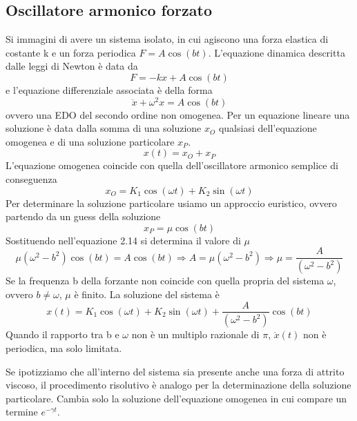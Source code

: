 \subsection{Oscillatore armonico forzato}
Si immagini di avere un sistema isolato, in cui agiscono una forza elastica di costante k e un forza periodica $F = A \cos(bt)$. L'equazione dinamica descritta dalle leggi di Newton \`{e} data da 
\begin{equation}
	F = -kx + A \cos(bt)
\end{equation}
e l'equazione differenziale associata \`{e} della forma 
\begin{equation}
	\ddot{x} + \omega^2x = A \cos (bt)
\end{equation}
ovvero una EDO del secondo ordine non omogenea. Per un equazione lineare una soluzione \`{e} data dalla somma di una soluzione $x_O$ qualsiasi dell'equazione omogenea e di una soluzione particolare $x_P$.
\begin{equation*}
	x(t) = x_O + x_P
\end{equation*}
L'equazione omogenea coincide con quella dell'oscillatore armonico semplice di conseguenza 
\begin{equation*}
	x_O = K_1 \cos(\omega t) + K_2 \sin(\omega t)
\end{equation*}
Per determinare la soluzione particolare usiamo un approccio euristico, ovvero partendo da un guess della soluzione 
\begin{equation*}
	x_P = \mu \cos(b t)
\end{equation*}
Sostituendo nell'equazione 2.14 si determina il valore di $\mu$
\begin{equation*}
	\mu(\omega^2 - b^2) \cos(bt) = A \cos(bt) \Rightarrow A  = \mu (\omega^2 - b^2) \Rightarrow
\boxed{\mu = \frac{A}{(\omega^2 - b^2)}}
\end{equation*}
Se la frequenza b della forzante non coincide con quella propria del sistema $\omega$, ovvero $b \neq \omega$, $\mu$ \`{e}  finito. La soluzione del sistema \`{e} 
\begin{equation}
	x(t) = K_1 \cos(\omega t) + K_2 \sin(\omega t) + \frac{A}{(\omega^2 - b^2)} \cos (bt)
\end{equation}
Quando il rapporto tra b e $\omega $ non \`{e} un multiplo razionale di $\pi$, $\dot{x}(t)$ non \`{e} periodica, ma solo limitata.\newline

\noindent Se ipotizziamo che all'interno del sistema sia presente anche una forza di attrito viscoso, il procedimento risolutivo \`{e} analogo per la determinazione della soluzione particolare. Cambia solo la soluzione dell'equazione omogenea in cui compare un termine $e^{- \gamma t}$. 

